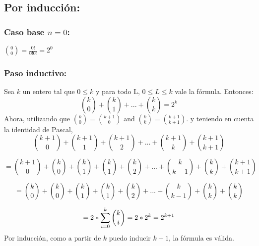 \subsection{Por inducci\'on:}
\subsubsection{Caso base $n=0$:  }
${{0}\choose{0}}={\frac{0!}{0!0!}}=2^0$  
  
\subsubsection{Paso inductivo:}
Sea $k$ un entero tal que $0\le{k}$
 y para todo L, $0\le{L}\le{k}$ vale la f\'ormula.
Entonces:  
$${{k}\choose{0}} + {{k}\choose{1}}+...+{{k}\choose{k}}=2^k$$
Ahora, utilizando que ${{k}\choose{0}}={{k+1}\choose{0}}$ and ${{k}\choose{k}}={{k+1}\choose{k+1}}$.  y teniendo en 
cuenta la identidad de Pascal,
\[
    {{k+1}\choose{0}}+{{k+1}\choose{1}}+{{k+1}\choose{2}}+...+{{k+1}\choose{k}}+{{k+1}\choose{k+1}}
\]

\[
    ={{k+1}\choose{0}}+{{k}\choose{0}}+{{k}\choose{1}}+{{k}\choose{1}}+{{k}\choose{2}}+...+{{k}\choose{k-1}}+{{k}\choose{k}}+{{k+1}\choose{k+1}}
\]

\[
    ={{k}\choose{0}}+{{k}\choose{0}}+{{k}\choose{1}}+{{k}\choose{1}}+{{k}\choose{2}}+...+{{k}\choose{k-1}}+{{k}\choose{k}}+{{k}\choose{k}}
\]

\[
    =2*{\sum_{i=0}^{k}{{k}\choose{i}}}\\=2*2^k\\=2^{k+1}
\]
Por inducci\'on, como a partir de $k$ puedo inducir $k+1$, la f\'ormula es v\'alida.